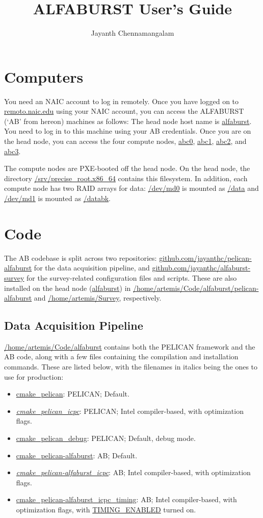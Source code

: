 \documentclass{article}
\title{ALFABURST User's Guide}
\author{Jayanth Chennamangalam}
\begin{document}
\maketitle

\tableofcontents

\section{Computers}

You need an NAIC account to log in remotely. Once you have logged on to
\url{remoto.naic.edu} using your NAIC account, you can access the ALFABURST
(`AB' from hereon) machines as follows: The head node host name is
\url{alfaburst}. You need to log in to this machine using your AB credentials.
Once you are on the head node, you can access the four compute nodes,
\url{abc0}, \url{abc1}, \url{abc2}, and \url{abc3}.

The compute nodes are PXE-booted off the head node. On the head node, the
directory \url{/srv/precise_root.x86_64} contains this filesystem. In addition,
each compute node has two RAID arrays for data: \url{/dev/md0} is mounted as
\url{/data} and \url{/dev/md1} is mounted as \url{/databk}.


\section{Code}

The AB codebase is split across two repositories:
\url{github.com/jayanthc/pelican-alfaburst} for the data acquisition pipeline,
and \url{github.com/jayanthc/alfaburst-survey} for the survey-related
configuration files and scripts. These are also installed on the head node
(\url{alfaburst}) in \url{/home/artemis/Code/alfaburst/pelican-alfaburst} and
\url{/home/artemis/Survey}, respectively.

\subsection{Data Acquisition Pipeline}

\url{/home/artemis/Code/alfaburst} contains both the PELICAN framework and the AB
code, along with a few files containing the compilation and installation
commands. These are listed below, with the filenames in italics being the ones
to use for production:

\begin{itemize}
\item \url{cmake_pelican}: PELICAN; Default.
\item \emph{\url{cmake_pelican_icpc}}: PELICAN; Intel compiler-based, with
optimization flags.
\item \url{cmake_pelican_debug}: PELICAN; Default, debug mode.
\item \url{cmake_pelican-alfaburst}: AB; Default.
\item \emph{\url{cmake_pelican-alfaburst_icpc}}: AB; Intel compiler-based,
with optimization flags.
\item \url{cmake_pelican-alfaburst_icpc_timing}: AB; Intel compiler-based, with
optimization flags, with \url{TIMING_ENABLED} turned on.
\end{itemize}
\end{document}
